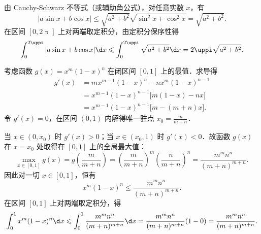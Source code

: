 \begin{myproof}

    由 Cauchy-Schwarz 不等式（或辅助角公式），对任意实数 $x$，有
    \begin{equation}
        |a\sin x + b\cos x| \leqslant \sqrt{a^2 + b^2} \sqrt{\sin^2 x + \cos^2 x} = \sqrt{a^2 + b^2}.
    \end{equation}
    在区间 $[0, 2\uppi]$ 上对两端取定积分，由定积分保序性得
    \begin{equation}
        \int_0^{2\uppi} |a\sin x + b\cos x| \d x \leqslant \int_0^{2\uppi} \sqrt{a^2 + b^2} \d x = 2\uppi\sqrt{a^2 + b^2}.
    \end{equation}


    考虑函数 $g(x) = x^m (1 - x)^n$ 在闭区间 $[0, 1]$ 上的最值．求导得
    \begin{equation}
        \begin{aligned}
            g'(x) & = m x^{m-1}(1 - x)^n - n x^m(1 - x)^{n-1}          \\
                  & = x^{m-1}(1 - x)^{n-1}\bigl[ m(1 - x) - n x \bigr] \\
                  & = x^{m-1}(1 - x)^{n-1}\bigl[ m - (m + n)x \bigr].
        \end{aligned}
    \end{equation}
    令 $g'(x) = 0$，在区间 $(0, 1)$ 内解得唯一驻点 $x_0 = \frac{m}{m + n}$．

    当 $x \in (0, x_0)$ 时 $g'(x) > 0$；当 $x \in (x_0, 1)$ 时 $g'(x) < 0$．故函数 $g(x)$ 在 $x = x_0$ 处取得在 $[0, 1]$ 上的全局最大值：
    \begin{equation}
        \max_{x\in [0, 1]} g(x) = g\left( \frac{m}{m + n} \right) = \left( \frac{m}{m + n} \right)^m \left( \frac{n}{m + n} \right)^n = \frac{m^m n^n}{(m + n)^{m+n}}.
    \end{equation}
    因此对一切 $x \in [0, 1]$，恒有
    \begin{equation}
        x^m (1 - x)^n \leqslant \frac{m^m n^n}{(m + n)^{m+n}}.
    \end{equation}
    在区间 $[0, 1]$ 上对两端取定积分，得
    \begin{equation}
        \int_0^1 x^m (1 - x)^n \d x \leqslant \int_0^1 \frac{m^m n^n}{(m + n)^{m+n}} \d x = \frac{m^m n^n}{(m + n)^{m+n}} (1 - 0) = \frac{m^m n^n}{(m + n)^{m+n}}.
    \end{equation}
\end{myproof}

